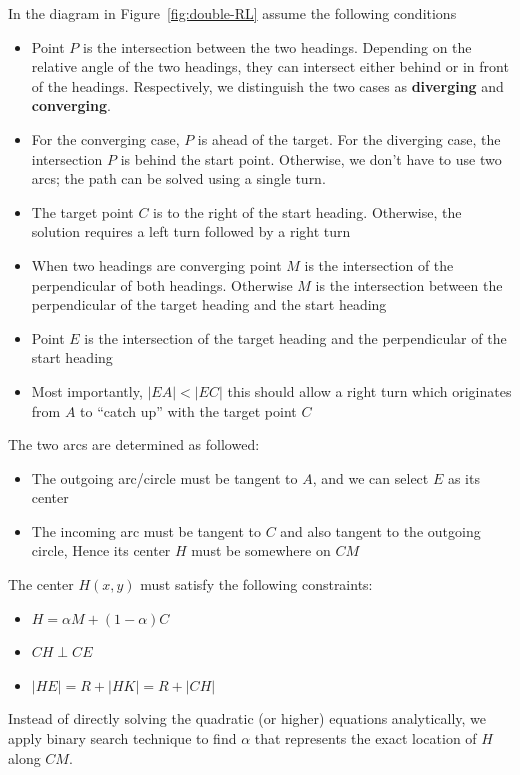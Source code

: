 \documentclass{article}
\begin{document}
In the diagram in Figure~\ref{fig:double-RL} assume the following conditions
\begin{itemize}
  \item Point $P$ is the intersection between the two headings. Depending on the relative angle of the two
        headings, they can intersect either behind or in front of the headings. Respectively, we distinguish
        the two cases as \textbf{diverging} and \textbf{converging}.
  \item For the converging case, $P$ is ahead of the target. For the diverging case,
        the intersection $P$ is behind the start point.
        Otherwise, we don't have to use two arcs; the path can be solved using a single turn.
  \item The target point $C$ is to the right of the start heading. Otherwise, the solution requires
        a left turn followed by a right turn
  \item When two headings are converging point $M$ is the intersection of the perpendicular of both headings.
  Otherwise $M$ is the intersection between the perpendicular of the target heading and the start heading
  \item Point $E$ is the intersection of the target heading and the perpendicular of the start heading
  \item Most importantly, $|EA| < |EC|$ this should allow a right turn which originates from $A$ to ``catch up''
        with the target point $C$
\end{itemize}


The two arcs are determined as followed:

\begin{itemize}
  \item The outgoing arc/circle must be tangent to $A$, and we can select $E$ as its center
  \item The incoming arc must be tangent to $C$ and also tangent to the outgoing circle,
        Hence its center $H$ must be somewhere on $CM$
\end{itemize}
The center $H(x,y)$ must satisfy the following constraints:

\begin{itemize}
  \item $H = \alpha M + (1-\alpha) C$
  \item $CH \perp CE$
  \item $|HE| = R + |HK| = R + |CH|$
\end{itemize}

Instead of directly solving the quadratic (or higher) equations analytically, we 
apply binary search technique to find $\alpha$ that represents the exact location of $H$ along $CM$.
\end{document}

